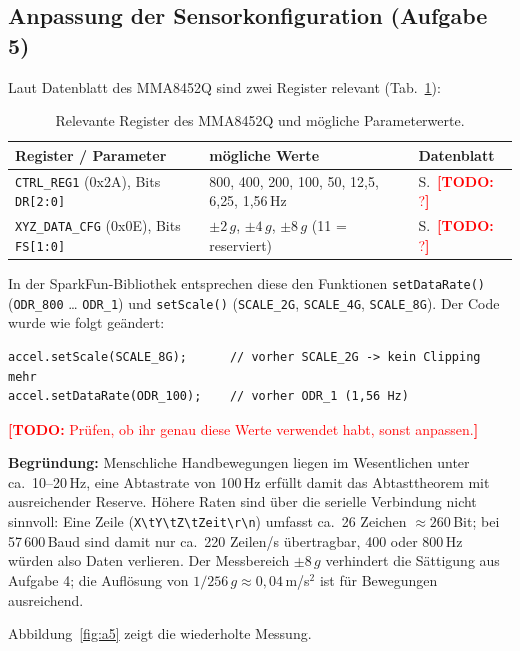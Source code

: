 \documentclass[a4paper,oneside,10pt]{article}
\newcommand{\todo}[1]{\textcolor{red}{\textbf{[TODO:} #1\textbf{]}}}
\begin{document}
\subsection{Anpassung der Sensorkonfiguration (Aufgabe 5)}

Laut Datenblatt des MMA8452Q \cite{mma8452q} sind zwei Register relevant
(Tab.~\ref{tab:register}):

\begin{table}[H]
\centering
\small
\caption{Relevante Register des MMA8452Q und mögliche Parameterwerte.}
\label{tab:register}
\begin{tabular}{lll}
\toprule
Register / Parameter & mögliche Werte & Datenblatt \\
\midrule
\texttt{CTRL\_REG1} (0x2A), Bits \texttt{DR[2:0]} &
  800, 400, 200, 100, 50, 12{,}5, 6{,}25, 1{,}56\,Hz & S.~\todo{?} \\
\texttt{XYZ\_DATA\_CFG} (0x0E), Bits \texttt{FS[1:0]} &
  $\pm 2\,g$, $\pm 4\,g$, $\pm 8\,g$ (11 = reserviert) & S.~\todo{?} \\
\bottomrule
\end{tabular}
\end{table}

In der SparkFun-Bibliothek entsprechen diese den Funktionen
\texttt{setDataRate()} (\texttt{ODR\_800} \ldots{} \texttt{ODR\_1}) und
\texttt{setScale()} (\texttt{SCALE\_2G}, \texttt{SCALE\_4G}, \texttt{SCALE\_8G}).
Der Code wurde wie folgt geändert:

\begin{lstlisting}
accel.setScale(SCALE_8G);      // vorher SCALE_2G -> kein Clipping mehr
accel.setDataRate(ODR_100);    // vorher ODR_1 (1,56 Hz)
\end{lstlisting}
\todo{Prüfen, ob ihr genau diese Werte verwendet habt, sonst anpassen.}

\textbf{Begründung:} Menschliche Handbewegungen liegen im Wesentlichen unter
ca.\ 10--20\,Hz, eine Abtastrate von 100\,Hz erfüllt damit das Abtasttheorem
mit ausreichender Reserve. Höhere Raten sind über die serielle Verbindung nicht
sinnvoll: Eine Zeile (\texttt{X\textbackslash tY\textbackslash tZ\textbackslash tZeit\textbackslash r\textbackslash n})
umfasst ca.\ 26 Zeichen $\approx 260$\,Bit; bei 57\,600\,Baud sind damit nur
ca.\ 220 Zeilen/s übertragbar, 400 oder 800\,Hz würden also Daten verlieren.
Der Messbereich $\pm 8\,g$ verhindert die Sättigung aus Aufgabe 4; die
Auflösung von $1/256\,g \approx 0{,}04$\,m/s$^2$ ist für Bewegungen ausreichend.

Abbildung~\ref{fig:a5} zeigt die wiederholte Messung.
\end{document}
